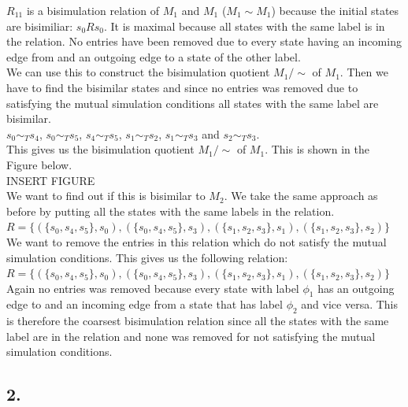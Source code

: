\documentclass[12pt]{report}
\begin{document}
$R_{11}$ is a bisimulation relation of $M_1$ and $M_1$ ($M_1 \sim M_1$) because the initial states are bisimiliar: $s_0 R s_0$. It is maximal because all states with the same label is in the relation. No entries have been removed due to every state having an incoming edge from and an outgoing edge to a state of the other label.\\
We can use this to construct the bisimulation quotient $M_1 / \sim$ of $M_1$. Then we have to find the bisimilar states and since no entries was removed due to satisfying the mutual simulation conditions all states with the same label are bisimilar.\\
$s_0 \sim_T s_4$, $s_0 \sim_T s_5$, $s_4 \sim_T s_5$, $s_1 \sim_T s_2$, $s_1 \sim_T s_3$ and $s_2 \sim_T s_3$.\\
This gives us the bisimulation quotient $M_1 / \sim$ of $M_1$. This is shown in the Figure below.\\
INSERT FIGURE\\ %
We want to find out if this is bisimilar to $M_2$. We take the same approach as before by putting all the states with the same labels in the relation.\\
$R = \{(\{s_0,s_4,s_5\},s_0), (\{s_0,s_4,s_5\},s_3), (\{s_1,s_2,s_3\},s_1), (\{s_1,s_2,s_3\},s_2)\}$\\
We want to remove the entries in this relation which do not satisfy the mutual simulation conditions. This gives us the following relation:\\
$R = \{(\{s_0,s_4,s_5\},s_0), (\{s_0,s_4,s_5\},s_3), (\{s_1,s_2,s_3\},s_1), (\{s_1,s_2,s_3\},s_2)\}$\\
Again no entries was removed because every state with label $\phi_1$ has an outgoing edge to and an incoming edge from a state that has label $\phi_2$ and vice versa. This is therefore the coarsest bisimulation relation since all the states with the same label are in the relation and none was removed for not satisfying the mutual simulation conditions.
\subsection*{2.}
\end{document}
